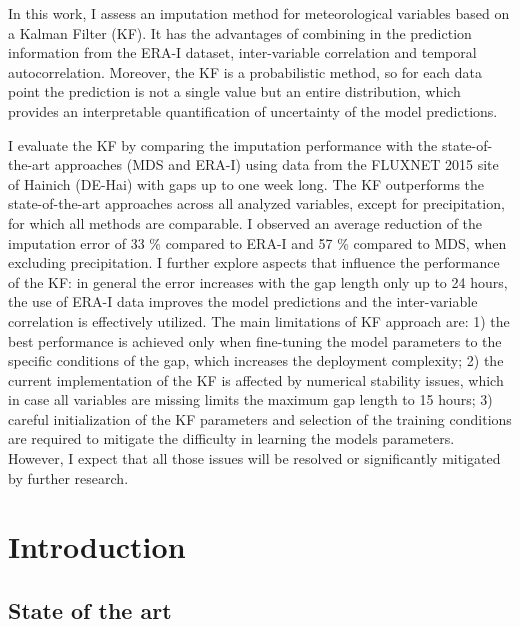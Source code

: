 \documentclass{article}
\let\Oldsection\section
\renewcommand{\section}{\FloatBarrier\Oldsection}
\let\Oldsubsection\subsection
\renewcommand{\subsection}{\FloatBarrier\Oldsubsection}
\begin{document}
In this work, I assess an imputation method for meteorological variables based on a Kalman Filter (KF). It has the advantages of combining in the prediction information from the ERA-I dataset, inter-variable correlation and  temporal autocorrelation. Moreover, the KF is a probabilistic method, so for each data point the prediction is not a single value but an entire distribution, which provides an interpretable quantification of uncertainty of the model predictions.

I evaluate the KF by  comparing the imputation performance with the state-of-the-art approaches (MDS and ERA-I) using data from the FLUXNET 2015 site of Hainich (DE-Hai) with gaps up to one week long. The KF outperforms the state-of-the-art approaches across all analyzed variables, except for precipitation, for which all methods are comparable. I observed an average reduction of the imputation error of 33 \% compared to ERA-I and  57 \% compared to MDS, when excluding precipitation. I further explore aspects that influence the performance of the KF: in general the error increases with the gap length only up to 24 hours, the use of ERA-I data improves the model predictions and the inter-variable correlation is effectively utilized.
The main limitations of KF approach are: 1) the best performance is achieved only when fine-tuning the model parameters to the specific conditions of the gap, which increases the deployment complexity; 2) the current implementation of the KF is affected by numerical stability issues, which in case all variables are missing limits the maximum gap length to 15 hours; 3) careful initialization of the KF parameters and selection of the training conditions are required to mitigate the difficulty in learning the models parameters. However, I expect that all those issues will be resolved or significantly mitigated by further research.
\thispagestyle{empty}
\clearpage


\tableofcontents
\thispagestyle{empty}
\clearpage

\section{Introduction}

\subsection{State of the art}
\end{document}
